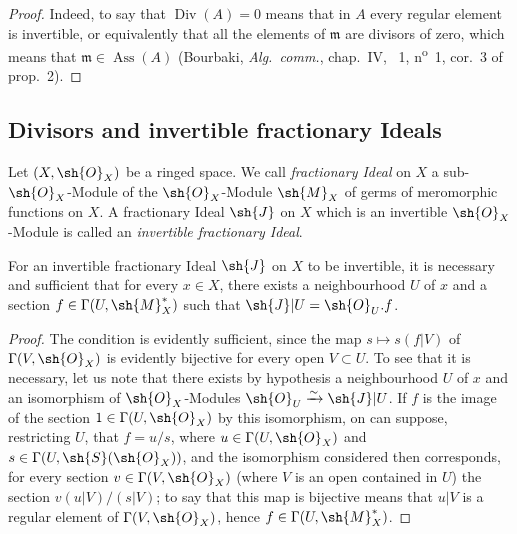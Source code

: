 \begin{proof}
Indeed, to say that $\operatorname{Div}(A)=0$ means that in $A$ every regular element is invertible, or equivalently that all the elements of $\mathfrak{m}$ are divisors of zero, which means that $\mathfrak{m}\in\operatorname{Ass}(A)$ (Bourbaki, \emph{Alg.\ comm.}, chap.~IV, \textsection~1, n\textsuperscript{o}~1, cor.~3 of prop.~2).
\end{proof}

\subsection{Divisors and invertible fractionary Ideals}
\label{subsection:IV.21.2}

\begin{env}[21.2.1]
\label{IV.21.2.1}
Let $(X,\sh{O}_X)$ be a ringed space.
We call \emph{fractionary Ideal} on $X$ a sub-$\sh{O}_X$-Module of the $\sh{O}_X$-Module $\sh{M}_X$ of germs of meromorphic functions on $X$.
A fractionary Ideal $\sh{J}$ on $X$ which is an invertible $\sh{O}_X$-Module is called an \emph{invertible fractionary Ideal}.
\end{env}

\begin{proposition}[21.2.2]
\label{IV.21.2.2}
For an invertible fractionary Ideal $\sh{J}$ on $X$ to be invertible, it is necessary and sufficient that for every $x\in X$, there exists a neighbourhood $U$ of $x$ and a section $f\in\Gamma(U,\sh{M}_X^*)$ such that $\sh{J}|U=\sh{O}_U.f$.
\end{proposition}

\begin{proof}
The condition is evidently sufficient, since the map $s\mapsto s(f|V)$ of $\Gamma(V,\sh{O}_X)$ is evidently bijective for every open $V\subset U$.
To see that it is necessary, let us note that there exists by hypothesis a neighbourhood $U$ of $x$ and an isomorphism of $\sh{O}_X$-Modules $\sh{O}_U\xrightarrow{\sim}\sh{J}|U$.
If $f$ is the image of the section $1\in\Gamma(U,\sh{O}_X)$ by this isomorphism, on can suppose, restricting $U$, that $f=u/s$, where $u\in\Gamma(U,\sh{O}_X)$ and $s\in\Gamma(U,\sh{S}(\sh{O}_X))$, and the isomorphism considered then corresponds, for every section $v\in\Gamma(V,\sh{O}_X)$ (where $V$ is an open contained in $U$) the section $v(u|V)/(s|V)$;
to say that this map is bijective means that $u|V$ is a regular element of $\Gamma(V,\sh{O}_X)$, hence $f\in\Gamma(U,\sh{M}_X^*)$.
\end{proof}

